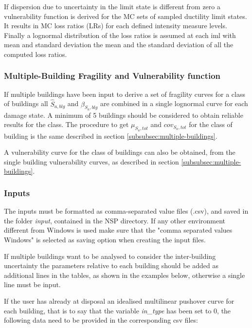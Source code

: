 If dispersion due to uncertainty in the limit state is different from zero a vulnerability function is derived for the MC sets of sampled ductility limit states. It results in MC loss ratios (LRs) for each defined intensity measure levels. Finally a lognormal distribution of the loss ratios is assumed at each iml with mean and standard deviation the mean and the standard deviation of all the computed loss ratios.

\subsubsection{Multiple-Building Fragility and Vulnerability function}
\label{subsubsec:multiple-building-spo2ida}
If multiple buildings have been input to derive a set of fragility curves for a class of buildings all $\hat{S}_{a,blg}$ and $\beta_{S_a,blg}$ are combined in a single lognormal curve for each damage state. A minimum of 5 buildings should be considered to obtain reliable results for the class. The procedure to get $\mu_{S_a,tot}$ and $cov_{S_a,tot}$ for the class of building is the same described in section \ref{subsubsec:multiple-buildings}.

A vulnerability curve for the class of buildings can also be obtained, from the single building vulnerability curves, as described in section \ref{subsubsec:multiple-buildings}.

\subsubsection{Inputs}
\label{subsubsec:InputSpo2ida}
The inputs must be formatted as comma-separated value files (.csv), and saved in the folder \textit{input}, contained in the NSP directory. If any other environment different from Windows is used make sure that the "comma separated values Windows" is selected as saving option when creating the input files. 

If multiple buildings want to be analysed to consider the inter-building uncertainty the parameters relative to each building should be added as additional lines in the tables, as shown in the examples below, otherwise a single line must be input.

If the user has already at disposal an idealised multilinear pushover curve for each building, that is to say that the variable \textit{in\_type} has been set to 0, the following data need to be provided in the corresponding csv files:

